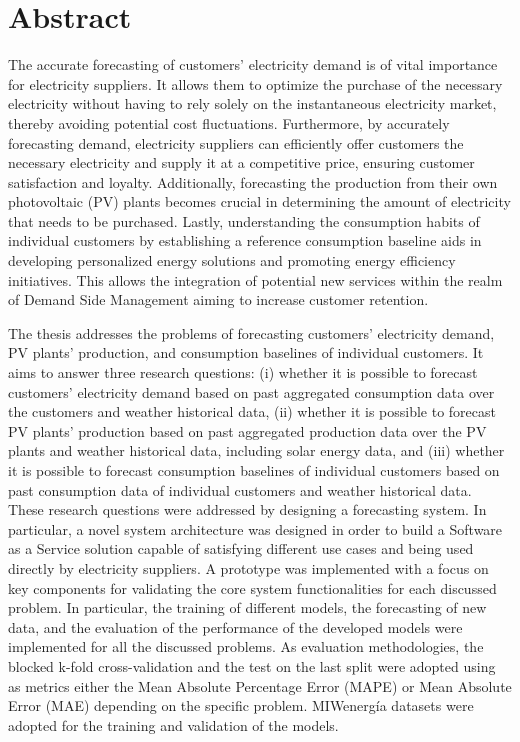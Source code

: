 \chapter*{Abstract} %
\label{abtract}

\vspace{0.4 cm}

The accurate forecasting of customers' electricity demand is of vital importance for electricity suppliers.
It allows them to optimize the purchase of the necessary electricity without having to rely solely on the instantaneous electricity market, thereby avoiding potential cost fluctuations.
Furthermore, by accurately forecasting demand, electricity suppliers can efficiently offer customers the necessary electricity and supply it at a competitive price, ensuring customer satisfaction and loyalty.
Additionally, forecasting the production from their own photovoltaic (PV) plants becomes crucial in determining the amount of electricity that needs to be purchased.
Lastly, understanding the consumption habits of individual customers by establishing a reference consumption baseline aids in developing personalized energy solutions and promoting energy efficiency initiatives.
This allows the integration of potential new services within the realm of Demand Side Management aiming to increase customer retention.

The thesis addresses the problems of forecasting customers' electricity demand, PV plants' production, and consumption baselines of individual customers.
It aims to answer three research questions:
(i) whether it is possible to forecast customers' electricity demand based on past aggregated consumption data over the customers and weather historical data,
(ii) whether it is possible to forecast PV plants' production based on past aggregated production data over the PV plants and weather historical data, including solar energy data,
and (iii) whether it is possible to forecast consumption baselines of individual customers based on past consumption data of individual customers and weather historical data.
These research questions were addressed by designing a forecasting system.
In particular, a novel system architecture was designed in order to build a Software as a Service solution capable of satisfying different use cases and being used directly by electricity suppliers.
A prototype was implemented with a focus on key components for validating the core system functionalities for each discussed problem.
In particular, the training of different models, the forecasting of new data, and the evaluation of the performance of the developed models were implemented for all the discussed problems.
As evaluation methodologies, the blocked k-fold cross-validation and the test on the last split were adopted using as metrics either the Mean Absolute Percentage Error (MAPE) or Mean Absolute Error (MAE) depending on the specific problem.
MIWenergía datasets were adopted for the training and validation of the models.

